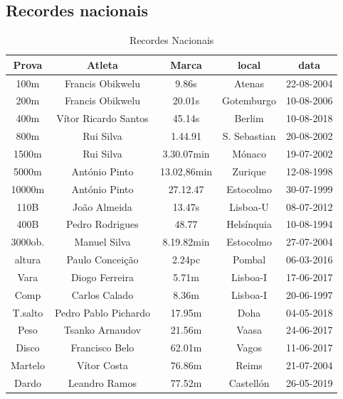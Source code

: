 \documentclass{report}
\begin{document}
    \subsection{Recordes nacionais}
    \begin{table}[h]
    \caption{Recordes Nacionais}
        \begin{tabular}{|c|c|c|c|c|}
            \hline
            Prova & Atleta & Marca & local & data  \\ \hline
            100m & Francis Obikwelu & 9.86s & Atenas & 22-08-2004 \\ \hline
            200m & Francis Obikwelu & 20.01s & Gotemburgo & 10-08-2006 \\ \hline
            400m & Vítor Ricardo Santos & 45.14s & Berlim & 10-08-2018 \\ \hline
            800m & Rui Silva & 1.44.91 & S. Sebastian & 20-08-2002 \\ \hline
            1500m & Rui Silva & 3.30.07min & Mónaco & 19-07-2002 \\ \hline
            5000m & António Pinto & 13.02,86min & Zurique & 12-08-1998 \\ \hline
            10000m & António Pinto & 27.12.47 & Estocolmo & 30-07-1999 \\ \hline
            110B & João Almeida & 13.47s & Lisboa-U & 08-07-2012 \\ \hline
            400B & Pedro Rodrigues & 48.77 & Helsínquia & 10-08-1994 \\ \hline
            3000ob. & Manuel Silva & 8.19.82min & Estocolmo & 27-07-2004 \\ \hline
            altura & Paulo Conceição & 2.24pc & Pombal & 06-03-2016 \\ \hline
            Vara & Diogo Ferreira & 5.71m & Lisboa-I & 17-06-2017 \\ \hline
            Comp & Carlos Calado & 8.36m & Lisboa-I & 20-06-1997 \\ \hline
            T.salto & Pedro Pablo Pichardo & 17.95m & Doha & 04-05-2018 \\ \hline
            Peso & Tsanko Arnaudov & 21.56m & Vaasa & 24-06-2017 \\ \hline
            Disco & Francisco Belo & 62.01m & Vagos & 11-06-2017 \\ \hline
            Martelo & Vítor Costa & 76.86m & Reims & 21-07-2004 \\ \hline
            Dardo & Leandro Ramos & 77.52m & Castellón & 26-05-2019 \\ \hline
        \end{tabular}
        \label{tab:recordesnacionais} \cite{recordesnacionais}
        
    
        
    \end{table}
 
\end{document}
